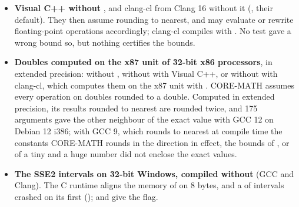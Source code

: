 \begin{itemize}
  false (GCC 9.4 and 13 at ,  and ;
  Clang 18 at , and at  and  when the
  bounds are ).
\item[$\bullet$] \textbf{Visual C++ without }, and clang-cl
  from Clang 16 without it (, their default). They then
  assume rounding to nearest, and may evaluate or rewrite floating-point
  operations accordingly; clang-cl compiles with . No test gave a wrong bound so, but nothing certifies the
  bounds.\newinvfive
\item[$\bullet$] \textbf{Doubles computed on the x87 unit of 32-bit x86
  processors}, in extended precision: without ,
  without  with Visual C++, or without 
  with clang-cl, which computes them on the x87 unit with .
  CORE-MATH assumes every operation on doubles rounded to a double. Computed
  in extended precision, its results rounded to nearest are rounded twice, and
  175 arguments gave the other neighbour of the exact value with GCC 12 on
  Debian 12 i386; with GCC 9, which rounds to nearest at compile time the
  constants CORE-MATH rounds in the direction in effect, the bounds of
  ,  or  of a tiny and a
  huge number did not enclose the exact values.
\item[$\bullet$] \textbf{The SSE2 intervals on 32-bit Windows, compiled without
  } (GCC and Clang). The C runtime aligns the memory of
   on 8 bytes, and a  of intervals crashed on its
  first  ();  and
   give the flag.
\end{itemize}

